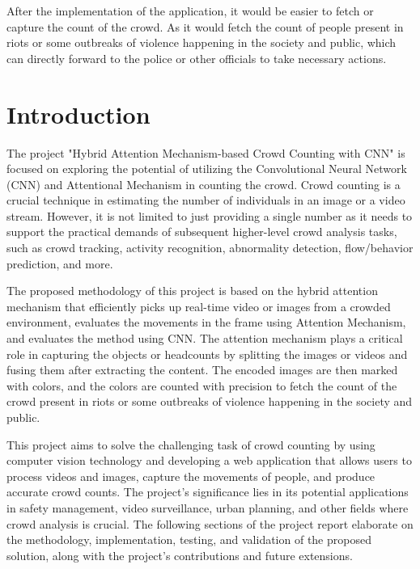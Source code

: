 \documentclass[12pt]{report}
\begin{document}
After the implementation of the application, it would be easier to fetch or capture the count of the crowd. As it would fetch the count of people present in riots or some outbreaks of violence happening in the society and public, which can directly forward to the police or other officials to take necessary actions.

\tableofcontents
\listoffigures
\listoftables
\thispagestyle{empty}

\chapter{Introduction}
\setcounter{page}{1}

The project "Hybrid Attention Mechanism-based Crowd Counting with CNN" is focused on exploring the potential of utilizing the Convolutional Neural Network (CNN) and Attentional Mechanism in counting the crowd. Crowd counting is a crucial technique in estimating the number of individuals in an image or a video stream. However, it is not limited to just providing a single number as it needs to support the practical demands of subsequent higher-level crowd analysis tasks, such as crowd tracking, activity recognition, abnormality detection, flow/behavior prediction, and more.
\newline

The proposed methodology of this project is based on the hybrid attention mechanism that efficiently picks up real-time video or images from a crowded environment, evaluates the movements in the frame using Attention Mechanism, and evaluates the method using CNN. The attention mechanism plays a critical role in capturing the objects or headcounts by splitting the images or videos and fusing them after extracting the content. The encoded images are then marked with colors, and the colors are counted with precision to fetch the count of the crowd present in riots or some outbreaks of violence happening in the society and public.
\newline

This project aims to solve the challenging task of crowd counting by using computer vision technology and developing a web application that allows users to process videos and images, capture the movements of people, and produce accurate crowd counts. The project's significance lies in its potential applications in safety management, video surveillance, urban planning, and other fields where crowd analysis is crucial. The following sections of the project report elaborate on the methodology, implementation, testing, and validation of the proposed solution, along with the project's contributions and future extensions.
\newline
\end{document}
